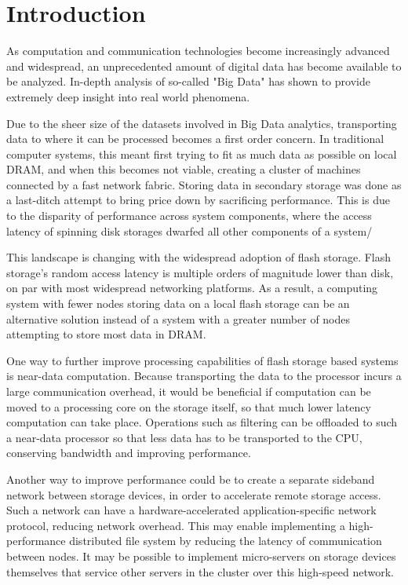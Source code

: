 \section{Introduction}

As computation and communication technologies become increasingly advanced and
widespread, an unprecedented amount of digital data has become available to be
analyzed. In-depth analysis of so-called "Big Data" has shown to provide
extremely deep insight into real world phenomena.

Due to the sheer size of the datasets involved in Big Data analytics,
transporting data to where it can be processed becomes a first order concern. In
traditional computer systems, this meant first trying to fit as much data as
possible on local DRAM, and when this becomes not viable, creating a cluster of
machines connected by a fast network fabric. Storing data in secondary storage
was done as a last-ditch attempt to bring price down by sacrificing performance.
This is due to the disparity of performance across system components, where the
access latency of spinning disk storages dwarfed all other components of a
system/




This landscape is changing with the widespread adoption of flash storage. Flash
storage’s random access latency is multiple orders of magnitude lower than disk,
on par with most widespread networking platforms. As a result, a computing
system with fewer nodes storing data on a local flash storage can be an
alternative solution instead of a system with a greater number of nodes
attempting to store most data in DRAM. 

One way to further improve processing capabilities of flash storage based
systems is near-data computation. Because transporting the data to the processor
incurs a large communication overhead, it would be beneficial if computation can
be moved to a processing core on the storage itself, so that much lower latency
computation can take place. Operations such as filtering can be offloaded to
such a near-data processor so that less data has to be transported to the CPU,
conserving bandwidth and improving performance. 

Another way to improve performance could be to create a separate sideband
network between storage devices, in order to accelerate remote storage access.
Such a network can have a hardware-accelerated application-specific network
protocol, reducing network overhead. This may enable implementing a
high-performance distributed file system by reducing the latency of
communication between nodes. It may be possible to implement micro-servers on
storage devices themselves that service other servers in the cluster over this
high-speed network.

